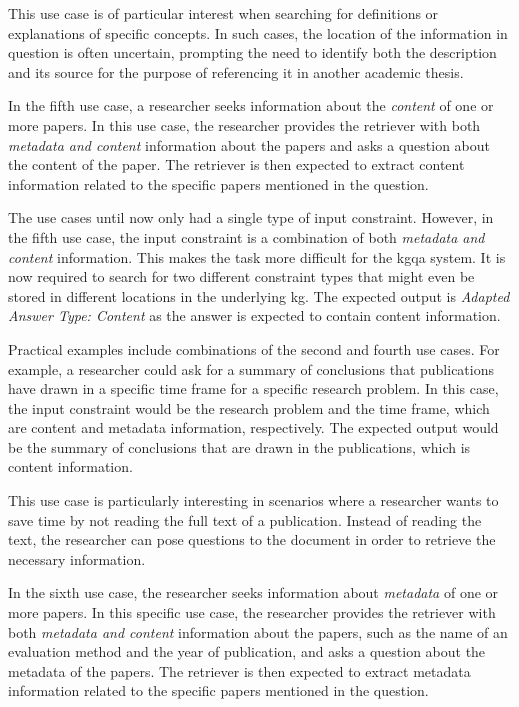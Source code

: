 This use case is of particular interest when searching for definitions or explanations of specific concepts. In such cases, the location of the information in question is often uncertain, prompting the need to identify both the description and its source for the purpose of referencing it in another academic thesis.

\begin{tcolorbox}[title=Use Case 5]
In the fifth use case, a researcher seeks information about the \emph{content} of one or more papers. In this use case, the researcher provides the retriever with both \emph{metadata and content} information about the papers and asks a question about the content of the paper. The retriever is then expected to extract content information related to the specific papers mentioned in the question.
\end{tcolorbox}

The use cases until now only had a single type of input constraint. However, in the fifth use case, the input constraint is a combination of both \emph{metadata and content} information. This makes the task more difficult for the \gls{kgqa} system. It is now required to search for two different constraint types that might even be stored in different locations in the underlying \gls{kg}. The expected output is \emph{Adapted Answer Type: Content} as the answer is expected to contain content information. 

Practical examples include combinations of the second and fourth use cases. For example, a researcher could ask for a summary of conclusions that publications have drawn in a specific time frame for a specific research problem. In this case, the input constraint would be the research problem and the time frame, which are content and metadata information, respectively. The expected output would be the summary of conclusions that are drawn in the publications, which is content information. 

This use case is particularly interesting in scenarios where a researcher wants to save time by not reading the full text of a publication. Instead of reading the text, the researcher can pose questions to the document in order to retrieve the necessary information.

\begin{tcolorbox}[title=Use Case 6]
In the sixth use case, the researcher seeks information about \emph{metadata} of one or more papers. In this specific use case, the researcher provides the retriever with both \emph{metadata and content} information about the papers, such as the name of an evaluation method and the year of publication, and asks a question about the metadata of the papers. The retriever is then expected to extract metadata information related to the specific papers mentioned in the question.
\end{tcolorbox}

